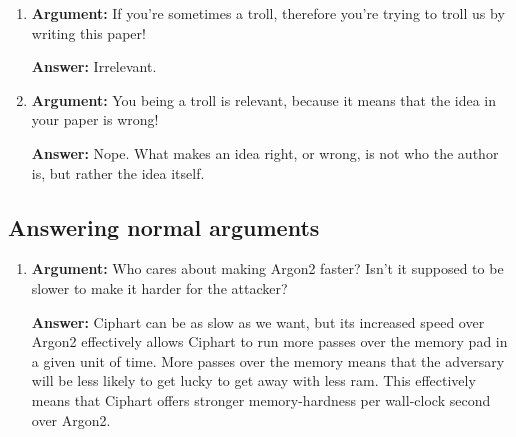 \documentclass[twocolumn]{article}
\begin{document}
\begin{enumerate}
    \item \textbf{Argument:} If you're sometimes a troll, therefore you're
    trying to troll us by writing this paper!

    \textbf{Answer:} Irrelevant.

    \item \textbf{Argument:} You being a troll is relevant, because it
    means that the idea in your paper is wrong!

    \textbf{Answer:} Nope.  What makes an idea right, or wrong, is not who
    the author is, but rather the idea itself.
\end{enumerate}

\subsection{Answering normal arguments}
\begin{enumerate}
    \item \textbf{Argument:} Who cares about making Argon2 faster?  Isn't
    it supposed to be slower to make it harder for the attacker?

    \textbf{Answer:} Ciphart can be as slow as we want, but its increased
    speed over Argon2 effectively allows Ciphart to run more passes over
    the memory pad in a given unit of time.  More passes over the memory
    means that the adversary will be less likely to get lucky to get away
    with less \gls{ram}.  This effectively means that Ciphart offers
    stronger memory-hardness per wall-clock second over Argon2.
\end{enumerate}
\end{document}
